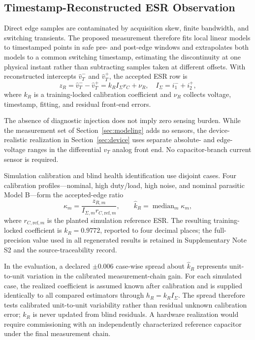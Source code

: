 \subsection{Timestamp-Reconstructed ESR Observation}

Direct edge samples are contaminated by acquisition skew, finite bandwidth, and switching transients. The proposed measurement therefore fits local linear models to timestamped points in safe pre- and post-edge windows and extrapolates both models to a common switching timestamp, estimating the discontinuity at one physical instant rather than subtracting samples taken at different offsets. With reconstructed intercepts $\hat v_T^-$ and $\hat v_T^+$, the accepted ESR row is
\begin{equation}
z_R=\hat v_T^- -\hat v_T^+
=k_R I_\Sigma r_C+\nu_R,
\quad I_\Sigma=i_1^-+i_2^+,
\label{eq:esr_observation}
\end{equation}
where $k_R$ is a training-locked calibration coefficient and $\nu_R$ collects voltage, timestamp, fitting, and residual front-end errors.

The absence of diagnostic injection does not imply zero sensing burden. While the measurement set of Section~\ref{sec:modeling} adds no sensors, the device-realistic realization in Section~\ref{sec:device} uses separate absolute- and edge-voltage ranges in the differential $v_T$ analog front end. No capacitor-branch current sensor is required.

Simulation calibration and blind health identification use disjoint cases. Four calibration profiles---nominal, high duty/load, high noise, and nominal parasitic Model B---form the accepted-edge ratio
\begin{equation}
\kappa_m=\frac{z_{R,m}}{I_{\Sigma,m}r_{C,\mathrm{ref},m}},
\qquad
\hat k_R=\operatorname{median}_m\kappa_m,
\label{eq:kr_calibration}
\end{equation}
where $r_{C,\mathrm{ref},m}$ is the planted simulation reference ESR. The resulting training-locked coefficient is $k_R=0.9772$, reported to four decimal places; the full-precision value used in all regenerated results is retained in Supplementary Note S2 and the source-traceability record.

In the evaluation, a declared $\pm0.006$ case-wise spread about $\hat k_R$ represents unit-to-unit variation in the calibrated measurement-chain gain. For each simulated case, the realized coefficient is assumed known after calibration and is supplied identically to all compared estimators through $h_R=k_RI_\Sigma$. The spread therefore tests calibrated unit-to-unit variability rather than residual unknown calibration error; $k_R$ is never updated from blind residuals. A hardware realization would require commissioning with an independently characterized reference capacitor under the final measurement chain.


